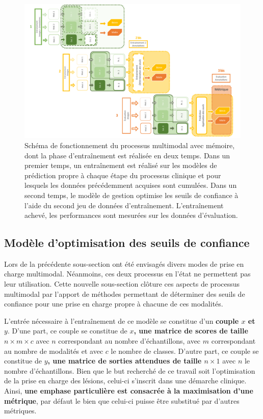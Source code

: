 \begin{landscape}
\begin{figure}[H]
    \centering
    \includegraphics[width=0.85\linewidth]{contents/chapter_8/resources/scheme_multimodal_process_with.pdf}
    \caption{Schéma de fonctionnement du processus multimodal avec mémoire, dont la phase d'entraînement est réalisée en deux temps. Dans un premier temps, un entraînement est réalisé sur les modèles de prédiction propre à chaque étape du processus clinique et pour lesquels les données précédemment acquises sont cumulées. Dans un second temps, le modèle de gestion optimise les seuils de confiance à l'aide du second jeu de données d'entraînement. L'entraînement achevé, les performances sont mesurées sur les données d'évaluation.}
    \label{fig:scheme_multimodal_process_with}
\end{figure}\par
\end{landscape}

\subsection{Modèle d'optimisation des seuils de confiance}
\label{sec:multimodal_confidence_model}
Lors de la précédente sous-section ont été envisagés divers modes de prise en charge multimodal. Néanmoins, ces deux processus en l'état ne permettent pas leur utilisation. Cette nouvelle sous-section clôture ces aspects de processus multimodal par l'apport de méthodes permettant de déterminer des seuils de confiance pour une prise en charge propre à chacune de ces modalités.\par

L'entrée nécessaire à l'entraînement de ce modèle se constitue d'un \textbf{couple $x$ et $y$}. D'une part, ce couple se constitue de \textbf{$x$, une matrice de scores de taille $n \times m \times c$} avec $n$ correspondant au nombre d'échantillons, avec $m$ correspondant au nombre de modalités et avec $c$ le nombre de classes. D'autre part, ce couple se constitue de \textbf{$y$, une matrice de sorties attendues de taille $n \times 1$} avec $n$ le nombre d'échantillons. Bien que le but recherché de ce travail soit l'optimisation de la prise en charge des lésions, celui-ci s'inscrit dans une démarche clinique. Ainsi, \textbf{une emphase particulière est consacrée à la maximisation d'une métrique}, par défaut le \fscore{} bien que celui-ci puisse être substitué par d'autres métriques.\par

